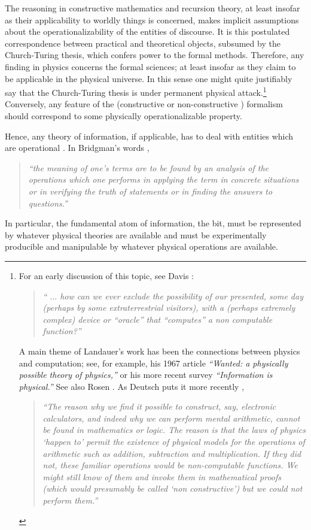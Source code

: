 The reasoning in constructive mathematics
\cite{bishop,bridges-richman,bridges-94} and recursion theory,
at least insofar as their applicability to worldly things is concerned,
makes implicit assumptions about the operationalizability
of the entities of
discourse.
It is this postulated correspondence
between practical and theoretical objects, subsumed by
the Church-Turing thesis,
which confers power to
the formal methods.
Therefore, any finding in physics concerns the formal sciences; at least
insofar as they claim to be applicable in the physical
universe.
In this sense one might quite justifiably say that the Church-Turing
thesis is under permanent physical attack.\footnote{
 For an early discussion of this topic, see
Davis
  \cite[p. 11]{davis-58}:
 \begin{quote}
 {\em `` $\ldots$ how can we ever exclude the possibility of our
 presented,
 some day (perhaps by some extraterrestrial visitors), with a (perhaps
 extremely complex) device or ``oracle'' that ``computes'' a
 non computable function?''
 }
 \end{quote}
A main theme of Landauer's  work has been the connections
between physics and computation; see, for example, his 1967 article
\cite{landauer-67}
{\em ``Wanted: a physically possible theory of physics,''} or his more
recent survey \cite{landauer} {\em ``Information is physical.''}
 See also  Rosen \cite{rosen}.
 As Deutsch puts it more recently  \cite[p. 101]{deutsch},
 \begin{quote}
 {\em
 ``The reason why we find it possible to construct, say, electronic
 calculators, and indeed why we can perform mental arithmetic, cannot
 be found in mathematics or logic. {\em
 The reason is that the laws of physics `happen to' permit the
 existence of physical models for the operations of arithmetic}
 such as addition, subtraction and multiplication.
 If they did not, these familiar operations would be
 non-computable functions. We might still
 know {\em of} them and invoke them in mathematical proofs
 (which would presumably be called `non constructive') but we could
 not perform them.''
 }
 \end{quote}
}
Conversely, any feature of the (constructive or non-constructive
\cite{bishop,bridges-richman,svozil-set}) formalism should correspond to
some physically operationalizable \cite{bridgman} property.

Hence, any theory of information, if applicable, has to deal with
entities
which are operational
\cite{bridgman,landauer,landauer-67,landauer-87,landauer-95}.
In Bridgman's words  \cite[p. V]{bridgman50},
 \begin{quote}
{\em
``the meaning of one's terms are to be found
by an analysis of the operations which one performs in applying the
term in concrete situations or in verifying the truth of statements or
in finding the answers to questions.''}
 \end{quote}
In particular, the fundamental atom  of information, the bit, must be
represented by whatever physical theories are available and must be
experimentally producible and manipulable by whatever physical
operations are available.


